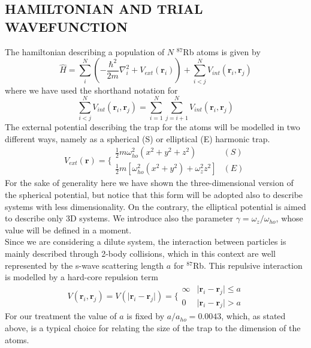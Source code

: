 \subsection{HAMILTONIAN AND TRIAL WAVEFUNCTION} \label{sec: 2.1 Ham and wave}
The hamiltonian describing a population of $N$ $^{87}$Rb atoms is given by
\begin{equation}
    \hat{H} = \sum_i^N \left(-\frac{\hbar^2}{2m}{\nabla}_{i}^2 +V_{ext}({\mathbf{r}}_i)\right)  + \sum_{i<j}^{N} V_{int}({\mathbf{r}}_i,{\mathbf{r}}_j)
    \label{hamiltonian}
\end{equation}
where we have used the shorthand notation for
\begin{equation*}
    \sum_{i<j}^N V_{int}({\mathbf{r}}_i,{\mathbf{r}}_j)  = \sum_{i=1}^N \sum_{j=i+1}^N V_{int}({\mathbf{r}}_i,{\mathbf{r}}_j)
\end{equation*}
The external potential describing the trap for the atoms will be modelled in two different ways, namely as a spherical (S) or elliptical (E) harmonic trap. 
\begin{equation}
    V_{ext}(\mathbf{r}) = \Bigg\{ 
    \begin{array}{ll} \frac{1}{2}m\omega_{ho}^2(x^2 + y^2 + z^2) & (S)\\ \frac{1}{2}m[\omega_{ho}^2(x^2+y^2) + \omega_z^2z^2] & (E) 
\end{array}
\label{potential}
\end{equation}
For the sake of generality here we have shown the three-dimensional version of the spherical potential, but notice that this form will be adopted also to describe systems with less dimensionality. On the contrary, the elliptical potential is aimed to describe only 3D systems. We introduce also the parameter $\gamma= \omega_z / \omega_{ho}$, whose value will be defined in a moment.\\

Since we are considering a dilute system, the interaction between particles is mainly described through 2-body collisions, which in this context are well represented by the s-wave scattering length $a$ for $^{87}$Rb. This repulsive interaction is modelled by a hard-core repulsion term
\begin{equation*}
    V(\bm{r}_i, \bm{r}_j) = V(\vert \bm{r}_i - \bm{r}_j \vert ) = \Bigg\{
    \begin{array}{ll}
        \infty &  \vert \bm{r}_i - \bm{r}_j \vert \leq a \\
        0 & \vert \bm{r}_i - \bm{r}_j \vert > a 
    \end{array}
\end{equation*}
For our treatment the value of $a$ is fixed by $a/a_{ho} = 0.0043$, which, as stated above, is a typical choice for relating the size of the trap to the dimension of the atoms. \\

